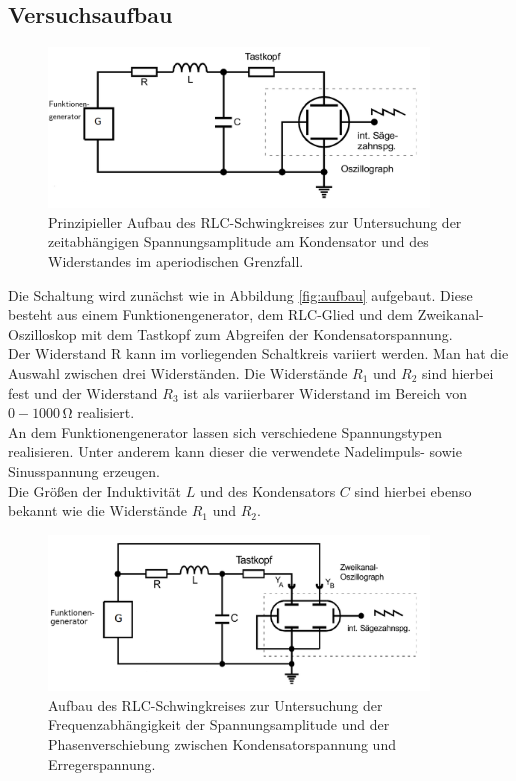 \subsection{Versuchsaufbau}
\label{sec:Versuchsaufbau}
\begin{figure}
  \centering
  \includegraphics[width=0.9\textwidth]{Bilder/aufbaau.png}
  \caption{Prinzipieller Aufbau des RLC-Schwingkreises zur Untersuchung der zeitabhängigen Spannungsamplitude am Kondensator und des Widerstandes im aperiodischen Grenzfall.}
  \label{fig:aufbau}
\end{figure}
Die Schaltung wird zunächst wie in Abbildung \eqref{fig:aufbau} aufgebaut. Diese besteht aus einem Funktionengenerator, dem RLC-Glied und dem Zweikanal-Oszilloskop mit dem Tastkopf zum Abgreifen der Kondensatorspannung.\\
Der Widerstand R kann im vorliegenden Schaltkreis variiert werden. Man hat die Auswahl zwischen drei Widerständen. Die Widerstände $R_\text{1}$ und $R_\text{2}$ sind hierbei fest und der Widerstand $R_\text{3}$ ist als variierbarer Widerstand im Bereich von $0-1000\,\si{\ohm}$ realisiert.\\
An dem Funktionengenerator lassen sich verschiedene Spannungstypen realisieren. Unter anderem kann dieser die verwendete Nadelimpuls- sowie Sinusspannung erzeugen.\\
Die Größen der Induktivität $L$ und des Kondensators $C$ sind hierbei ebenso bekannt wie die Widerstände $R_\text{1}$ und $R_\text{2}$.

\begin{figure}
  \centering
  \includegraphics[width=0.9\textwidth]{Bilder/aufbauu.png}
  \caption{Aufbau des RLC-Schwingkreises zur Untersuchung der Frequenzabhängigkeit der Spannungsamplitude und der Phasenverschiebung zwischen Kondensatorspannung und Erregerspannung.}
  \label{fig:aufbau2}
\end{figure}

